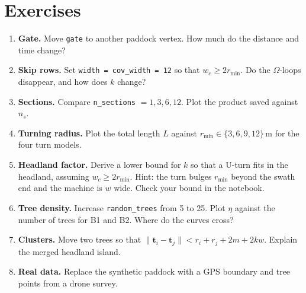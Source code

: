 \documentclass[11pt,a4paper]{article}
\newcommand{\code}[1]{\texttt{\small #1}}
\begin{document}
\section{Exercises}
\begin{enumerate}
  \item \textbf{Gate.} Move \code{gate} to another paddock vertex. How much do the distance and time change?
  \item \textbf{Skip rows.} Set \code{width = cov\_width = 12} so that $w_c\ge 2r_{\min}$. Do the $\Omega$-loops disappear, and how does $k$ change?
  \item \textbf{Sections.} Compare \code{n\_sections} $=1,3,6,12$. Plot the product saved against $n_s$.
  \item \textbf{Turning radius.} Plot the total length $L$ against $r_{\min}\in\{3,6,9,12\}$\,m for the four turn models.
  \item \textbf{Headland factor.} Derive a lower bound for $k$ so that a U-turn fits in the headland, assuming
        $w_c\ge 2r_{\min}$. Hint: the turn bulges $r_{\min}$ beyond the swath end and the machine is $w$ wide.
        Check your bound in the notebook.
  \item \textbf{Tree density.} Increase \code{random\_trees} from 5 to 25. Plot $\eta$ against the number of trees for B1 and B2.
        Where do the curves cross?
  \item \textbf{Clusters.} Move two trees so that $\lVert\mathbf t_i-\mathbf t_j\rVert<r_i+r_j+2m+2kw$. Explain the merged headland island.
  \item \textbf{Real data.} Replace the synthetic paddock with a GPS boundary and tree points from a drone survey.
\end{enumerate}

\end{document}
